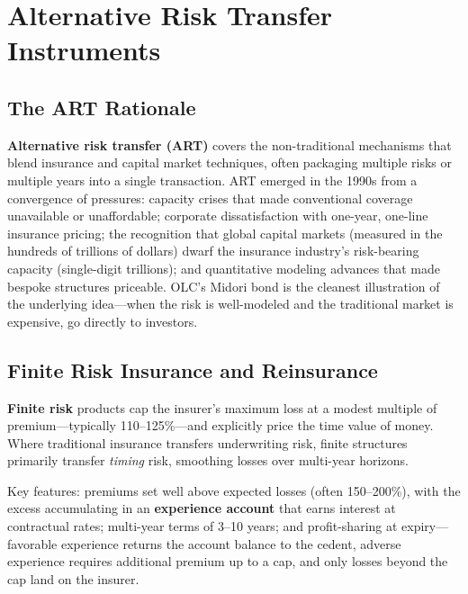 \documentclass[11pt,openany]{book}
\begin{document}
\section{Alternative Risk Transfer Instruments}
\label{sec:art}

\subsection{The ART Rationale}

\textbf{Alternative risk transfer (ART)} covers the non-traditional
mechanisms that blend insurance and capital market techniques, often
packaging multiple risks or multiple years into a single transaction. ART
emerged in the 1990s from a convergence of pressures: capacity crises that
made conventional coverage unavailable or unaffordable; corporate
dissatisfaction with one-year, one-line insurance pricing; the recognition
that global capital markets (measured in the hundreds of trillions of
dollars) dwarf the insurance industry's risk-bearing capacity (single-digit
trillions); and quantitative modeling advances that made bespoke structures
priceable. OLC's Midori bond is the cleanest illustration of the underlying
idea---when the risk is well-modeled and the traditional market is expensive,
go directly to investors.

\subsection{Finite Risk Insurance and Reinsurance}
\label{subsec:finite}

\textbf{Finite risk} products cap the insurer's maximum loss at a modest
multiple of premium---typically 110--125\%---and explicitly price the time
value of money. Where traditional insurance transfers underwriting risk,
finite structures primarily transfer \emph{timing} risk, smoothing losses
over multi-year horizons.

Key features: premiums set well above expected losses (often 150--200\%),
with the excess accumulating in an \textbf{experience account} that earns
interest at contractual rates; multi-year terms of 3--10 years; and
profit-sharing at expiry---favorable experience returns the account balance
to the cedent, adverse experience requires additional premium up to a cap,
and only losses beyond the cap land on the insurer.
\end{document}
